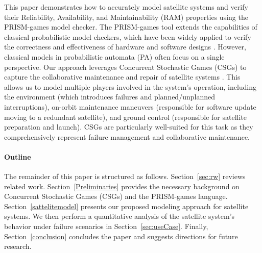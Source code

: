 This paper demonstrates how to accurately model satellite systems and verify their Reliability, Availability, and Maintainability (RAM) properties using the PRISM-games model checker. The PRISM-games tool extends the capabilities of classical probabilistic model checkers, which have been widely applied to verify the correctness and effectiveness of hardware and software designs \cite{prismmodelchecker}. However, classical models in probabilistic automata (PA) often focus on a single perspective.  Our approach leverages Concurrent Stochastic Games (CSGs) to capture the collaborative maintenance and repair of satellite systems \cite{Hoque2015,Yu2015,Zhaoguang2013}. This allows us to model multiple players involved in the system's operation, including the environment (which introduces failures and planned/unplanned interruptions), on-orbit maintenance maneuvers (responsible for software update moving to a redundant satellite), and ground control (responsible for satellite preparation and launch). CSGs are particularly well-suited for this task as they comprehensively represent failure management and collaborative maintenance.


\paragraph*{Outline}The remainder of this paper is structured as follows. Section~\ref{sec:rw} reviews related work. Section~\ref{Preliminaries} provides the necessary background on Concurrent Stochastic Games (CSGs) and the PRISM-games language. Section~\ref{sattelitemodel} presents our proposed modeling approach for satellite systems. We then perform a quantitative analysis of the satellite system's behavior under failure scenarios in Section~\ref{sec:useCase}. Finally, Section~\ref{conclusion} concludes the paper and suggests directions for future research.
